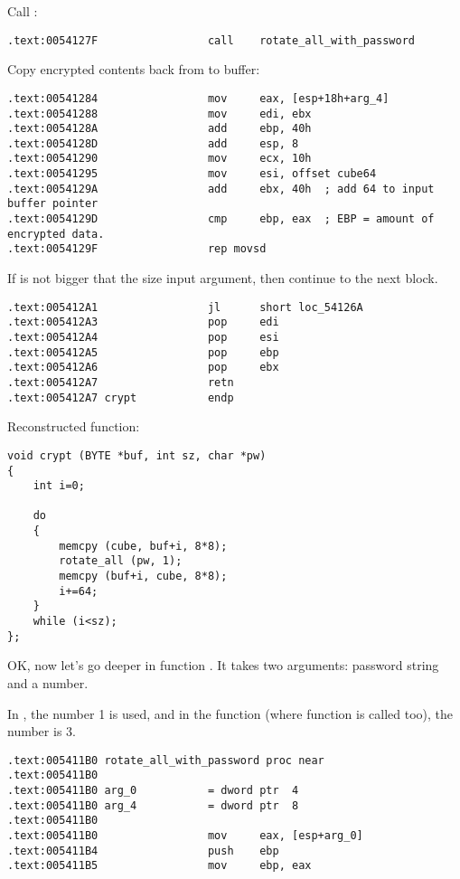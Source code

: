 Call :

\begin{lstlisting}[style=customasmx86]
.text:0054127F                 call    rotate_all_with_password
\end{lstlisting}

Copy encrypted contents back from  to buffer:

\begin{lstlisting}[style=customasmx86]
.text:00541284                 mov     eax, [esp+18h+arg_4]
.text:00541288                 mov     edi, ebx
.text:0054128A                 add     ebp, 40h
.text:0054128D                 add     esp, 8
.text:00541290                 mov     ecx, 10h
.text:00541295                 mov     esi, offset cube64
.text:0054129A                 add     ebx, 40h  ; add 64 to input buffer pointer
.text:0054129D                 cmp     ebp, eax  ; EBP = amount of encrypted data.
.text:0054129F                 rep movsd
\end{lstlisting}

If \EBP is not bigger that the size input argument, then continue to the next block.

\begin{lstlisting}[style=customasmx86]
.text:005412A1                 jl      short loc_54126A
.text:005412A3                 pop     edi
.text:005412A4                 pop     esi
.text:005412A5                 pop     ebp
.text:005412A6                 pop     ebx
.text:005412A7                 retn
.text:005412A7 crypt           endp
\end{lstlisting}

Reconstructed  function:

\begin{lstlisting}[style=customc]
void crypt (BYTE *buf, int sz, char *pw)
{
	int i=0;
	
	do
	{
		memcpy (cube, buf+i, 8*8);
		rotate_all (pw, 1);
		memcpy (buf+i, cube, 8*8);
		i+=64;
	}
	while (i<sz);
};
\end{lstlisting}

OK, now let's go deeper in function . 
It takes two arguments: password string and a number.

In , the number 1 is used, and in the  function (where  function 
is called too), the number is 3.

\begin{lstlisting}[style=customasmx86]
.text:005411B0 rotate_all_with_password proc near
.text:005411B0
.text:005411B0 arg_0           = dword ptr  4
.text:005411B0 arg_4           = dword ptr  8
.text:005411B0
.text:005411B0                 mov     eax, [esp+arg_0]
.text:005411B4                 push    ebp
.text:005411B5                 mov     ebp, eax
\end{lstlisting}

